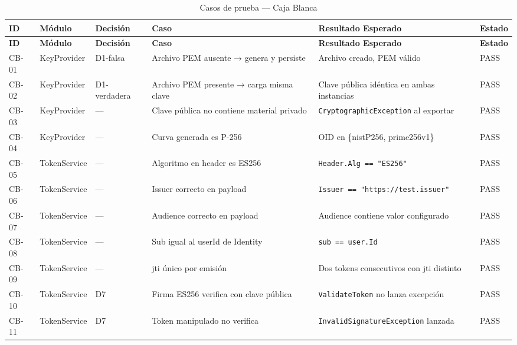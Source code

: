 \documentclass[11pt,a4paper]{article}
\begin{document}
\begin{longtable}{|p{0.9cm}|p{2.4cm}|p{2cm}|p{4cm}|p{3.6cm}|p{1.1cm}|}
\caption{Casos de prueba — Caja Blanca}\label{tab:cb}\\
\hline
\rowcolor{headerblue}
\color{white}\textbf{ID} & \color{white}\textbf{Módulo} & \color{white}\textbf{Decisión} & \color{white}\textbf{Caso} & \color{white}\textbf{Resultado Esperado} & \color{white}\textbf{Estado} \\
\hline
\endfirsthead
\hline
\rowcolor{headerblue}
\color{white}\textbf{ID} & \color{white}\textbf{Módulo} & \color{white}\textbf{Decisión} & \color{white}\textbf{Caso} & \color{white}\textbf{Resultado Esperado} & \color{white}\textbf{Estado} \\
\hline
\endhead

CB-01 & KeyProvider & D1-falsa & Archivo PEM ausente → genera y persiste & Archivo creado, PEM válido & PASS \\
\hline
\rowcolor{rowgray}
CB-02 & KeyProvider & D1-verdadera & Archivo PEM presente → carga misma clave & Clave pública idéntica en ambas instancias & PASS \\
\hline
CB-03 & KeyProvider & — & Clave pública no contiene material privado & \texttt{CryptographicException} al exportar & PASS \\
\hline
\rowcolor{rowgray}
CB-04 & KeyProvider & — & Curva generada es P-256 & OID en \{nistP256, prime256v1\} & PASS \\
\hline
CB-05 & TokenService & — & Algoritmo en header es ES256 & \texttt{Header.Alg == "ES256"} & PASS \\
\hline
\rowcolor{rowgray}
CB-06 & TokenService & — & Issuer correcto en payload & \texttt{Issuer == "https://test.issuer"} & PASS \\
\hline
CB-07 & TokenService & — & Audience correcto en payload & Audience contiene valor configurado & PASS \\
\hline
\rowcolor{rowgray}
CB-08 & TokenService & — & Sub igual al userId de Identity & \texttt{sub == user.Id} & PASS \\
\hline
CB-09 & TokenService & — & jti único por emisión & Dos tokens consecutivos con jti distinto & PASS \\
\hline
\rowcolor{rowgray}
CB-10 & TokenService & D7 & Firma ES256 verifica con clave pública & \texttt{ValidateToken} no lanza excepción & PASS \\
\hline
CB-11 & TokenService & D7 & Token manipulado no verifica & \texttt{InvalidSignatureException} lanzada & PASS \\

\end{longtable}
\end{document}
